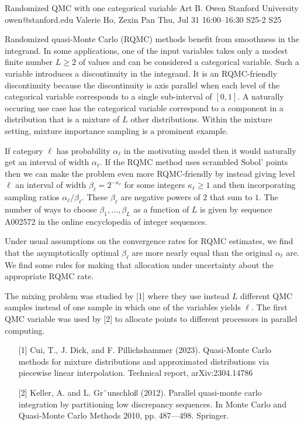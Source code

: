 \begin{talk}
  {Randomized QMC with one categorical variable}%
  {Art B. Owen}%
  {Stanford University}%
  {owen@stanford.edu}%
  {Valerie Ho, Zexin Pan}%
  {}%
  {Thu, Jul 31 16:00–16:30}%
  {S25-2}%
  {S25}%
  
				
			
  Randomized quasi-Monte Carlo (RQMC) methods benefit from smoothness
  in the integrand.  In some applications, one of the input variables takes
  only a modest finite number $L\geqslant2$
of values and can be considered a categorical
  variable. Such a variable introduces a discontinuity in the integrand.  It is
  an RQMC-friendly discontinuity because the discontinuity is axis parallel
  when each level of the categorical variable corresponds to a single
  sub-interval of $[0,1]$.  A naturally occuring use case has
  the categorical variable correspond to a component in a distribution
  that is a mixture of $L$ other distributions.  Within the mixture
  setting, mixture importance sampling is a prominent example.

 If category $\ell$  has probability $\alpha_\ell$ in the motivating
  model then it would naturally get an interval of width $\alpha_\ell$.
If the RQMC method uses scrambled Sobol' points
then we can make the problem even more RQMC-friendly by instead giving
  level $\ell$ an interval of width $\beta_\ell = 2^{-\kappa_\ell}$
  for some integers $\kappa_\ell \geqslant1$ and then
  incorporating sampling ratios $\alpha_\ell/\beta_\ell$.
  These $\beta_\ell$ are negative powers of $2$ that sum to $1$.
  The number of ways to choose $\beta_1,\dots,\beta_L$
  as a function of $L$ is given by sequence A002572 in the
  online encyclopedia of integer sequences.

  Under usual assumptions on the convergence rates for RQMC
  estimates, we find that the asymptotically optimal $\beta_\ell$
  are more nearly equal than the original $\alpha_\ell$ are.
  We find some rules for making that  allocation under uncertainty
  about the appropriate RQMC rate.

  The mixing problem was studied by [1] where they use instead
  $L$ different QMC samples instead of one sample in which
  one of the variables yields $\ell$. The first QMC variable
  was used by [2] to allocate points to different processors
  in parallel computing.

\medskip
\begin{enumerate}
	\item[{[1]}] Cui, T., J. Dick, and F. Pillichshammer (2023). Quasi-Monte Carlo methods
for mixture distributions and approximated distributions via piecewise linear
interpolation. Technical report, arXiv:2304.14786 
\item[{[2]}]
Keller, A. and L. Gr¨unschloß (2012). Parallel quasi-monte carlo integration by
partitioning low discrepancy sequences. In Monte Carlo and Quasi-Monte
Carlo Methods 2010, pp. 487---498. Springer.
\end{enumerate}

\end{talk}

